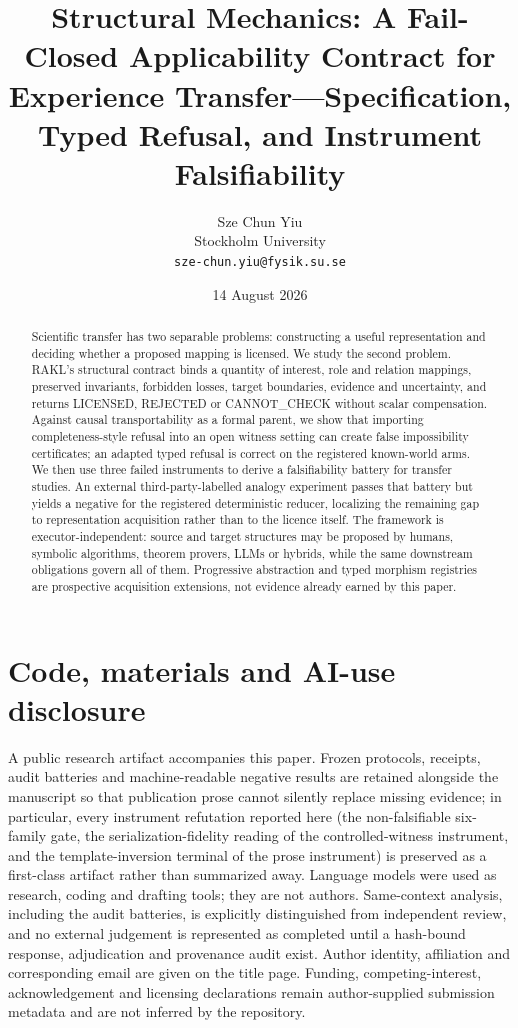 \documentclass[11pt]{article}
\title{Structural Mechanics: A Fail-Closed Applicability Contract for Experience Transfer---Specification, Typed Refusal, and Instrument Falsifiability}
\author{Sze Chun Yiu\\Stockholm University\\\texttt{sze-chun.yiu@fysik.su.se}}
\date{14 August 2026}
\begin{document}
\maketitle
\begin{abstract}
Scientific transfer has two separable problems: constructing a useful representation and deciding whether a proposed mapping is licensed. We study the second problem. RAKL's structural contract binds a quantity of interest, role and relation mappings, preserved invariants, forbidden losses, target boundaries, evidence and uncertainty, and returns LICENSED, REJECTED or CANNOT\_CHECK without scalar compensation. Against causal transportability as a formal parent, we show that importing completeness-style refusal into an open witness setting can create false impossibility certificates; an adapted typed refusal is correct on the registered known-world arms. We then use three failed instruments to derive a falsifiability battery for transfer studies. An external third-party-labelled analogy experiment passes that battery but yields a negative for the registered deterministic reducer, localizing the remaining gap to representation acquisition rather than to the licence itself. The framework is executor-independent: source and target structures may be proposed by humans, symbolic algorithms, theorem provers, LLMs or hybrids, while the same downstream obligations govern all of them. Progressive abstraction and typed morphism registries are prospective acquisition extensions, not evidence already earned by this paper.
\end{abstract}










\section*{Code, materials and AI-use disclosure}
A public research artifact accompanies this paper. Frozen protocols, receipts, audit batteries and machine-readable negative results are retained alongside the manuscript so that publication prose cannot silently replace missing evidence; in particular, every instrument refutation reported here (the non-falsifiable six-family gate, the serialization-fidelity reading of the controlled-witness instrument, and the template-inversion terminal of the prose instrument) is preserved as a first-class artifact rather than summarized away. Language models were used as research, coding and drafting tools; they are not authors. Same-context analysis, including the audit batteries, is explicitly distinguished from independent review, and no external judgement is represented as completed until a hash-bound response, adjudication and provenance audit exist. Author identity, affiliation and corresponding email are given on the title page. Funding, competing-interest, acknowledgement and licensing declarations remain author-supplied submission metadata and are not inferred by the repository.


\end{document}
